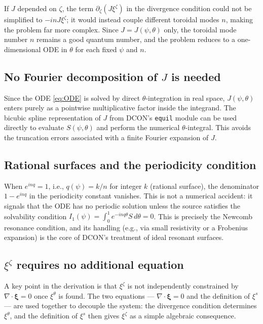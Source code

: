 \documentclass[12pt,a4paper]{article}
\newcommand{\bxi}{\boldsymbol{\xi}}
\begin{document}
If $J$ depended on $\zeta$, the term $\partial_\zeta(J\xi^\zeta)$ in the divergence condition could not be simplified to $-inJ\xi^\zeta$; it would instead couple different toroidal modes $n$, making the problem far more complex. Since $J = J(\psi,\theta)$ only, the toroidal mode number $n$ remains a good quantum number, and the problem reduces to a one-dimensional ODE in $\theta$ for each fixed $\psi$ and $n$.

\subsection*{No Fourier decomposition of $J$ is needed}

Since the ODE \eqref{eq:ODE} is solved by direct $\theta$-integration in real space, $J(\psi,\theta)$ enters purely as a pointwise multiplicative factor inside the integrand. The bicubic spline representation of $J$ from DCON's \texttt{equil} module can be used directly to evaluate $S(\psi,\theta)$ and perform the numerical $\theta$-integral. This avoids the truncation errors associated with a finite Fourier expansion of $J$.

\subsection*{Rational surfaces and the periodicity condition}

When $e^{inq} = 1$, i.e., $q(\psi) = k/n$ for integer $k$ (rational surface), the denominator $1 - e^{inq}$ in the periodicity constant vanishes. This is not a numerical accident: it signals that the ODE has no periodic solution unless the source satisfies the solvability condition $I_1(\psi) = \int_0^1 e^{-inq\theta}S\,d\theta = 0$. This is precisely the Newcomb resonance condition, and its handling (e.g., via small resistivity or a Frobenius expansion) is the core of DCON's treatment of ideal resonant surfaces.

\subsection*{$\xi^\zeta$ requires no additional equation}

A key point in the derivation is that $\xi^\zeta$ is not independently constrained by $\nabla\cdot\bxi = 0$ once $\xi^\theta$ is found. The two equations --- $\nabla\cdot\bxi=0$ and the definition of $\xi^s$ --- are used together to decouple the system: the divergence condition determines $\xi^\theta$, and the definition of $\xi^s$ then gives $\xi^\zeta$ as a simple algebraic consequence.
\end{document}

